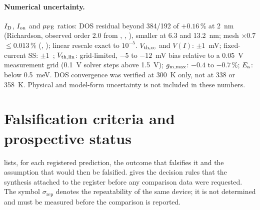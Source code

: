 \paragraph{Numerical uncertainty.} $I_{\mathrm{D}}$, $I_{\mathrm{on}}$ and $\mu_{\mathrm{FE}}$ ratios: DOS residual beyond 384/192 of $+0.16$\,\% at 2~nm (Richardson, observed order 2.0 from , , ), smaller at 6.3 and 13.2~nm; mesh $\times0.7$ $\le 0.013$\,\% (, ); linear rescale exact to $10^{-5}$. $V_{\mathrm{th,cc}}$ and $V(I)$: $\pm1$~mV; fixed-current SS: $\pm1$~\mVdec; $V_{\mathrm{th,lin}}$: grid-limited, $-5$ to $-12$~mV bias relative to a 0.05~V measurement grid (0.1~V solver steps above 1.5~V); $g_{\mathrm{m,max}}$: $-0.4$ to $-0.7$\,\%; $E_{\mathrm{a}}$: below 0.5~meV. DOS convergence was verified at 300~K only, not at 338 or 358~K. Physical and model-form uncertainty is not included in these numbers.

\section{Falsification criteria and prospective status}\label{sec:pred-falsification}

 lists, for each registered prediction, the outcome that falsifies it and the assumption that would then be falsified.  gives the decision rules that the synthesis attached to the register before any comparison data were requested. The symbol $\sigma_{\mathrm{rep}}$ denotes the repeatability of the same device; it is not determined and must be measured before the comparison is reported.

